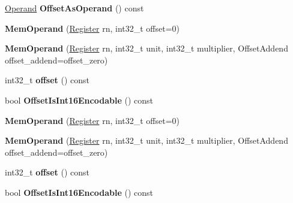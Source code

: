 \begin{DoxyCompactItemize}
\item 
\hyperlink{classv8_1_1internal_1_1_operand}{Operand} {\bfseries Offset\+As\+Operand} () const \hypertarget{classv8_1_1internal_1_1_mem_operand_aabe0e2c14d46c214bda605293d7804b3}{}\label{classv8_1_1internal_1_1_mem_operand_aabe0e2c14d46c214bda605293d7804b3}

\item 
{\bfseries Mem\+Operand} (\hyperlink{structv8_1_1internal_1_1_register}{Register} rn, int32\+\_\+t offset=0)\hypertarget{classv8_1_1internal_1_1_mem_operand_a7edbeda729ce9248b7151164c72e41ef}{}\label{classv8_1_1internal_1_1_mem_operand_a7edbeda729ce9248b7151164c72e41ef}

\item 
{\bfseries Mem\+Operand} (\hyperlink{structv8_1_1internal_1_1_register}{Register} rn, int32\+\_\+t unit, int32\+\_\+t multiplier, Offset\+Addend offset\+\_\+addend=offset\+\_\+zero)\hypertarget{classv8_1_1internal_1_1_mem_operand_a5cd48c156f36f5795f1982b2ccb52740}{}\label{classv8_1_1internal_1_1_mem_operand_a5cd48c156f36f5795f1982b2ccb52740}

\item 
int32\+\_\+t {\bfseries offset} () const \hypertarget{classv8_1_1internal_1_1_mem_operand_a6f903824080ee1303755a0132bb93d79}{}\label{classv8_1_1internal_1_1_mem_operand_a6f903824080ee1303755a0132bb93d79}

\item 
bool {\bfseries Offset\+Is\+Int16\+Encodable} () const \hypertarget{classv8_1_1internal_1_1_mem_operand_ab944c21969d5900518c8d222248e7d3b}{}\label{classv8_1_1internal_1_1_mem_operand_ab944c21969d5900518c8d222248e7d3b}

\item 
{\bfseries Mem\+Operand} (\hyperlink{structv8_1_1internal_1_1_register}{Register} rn, int32\+\_\+t offset=0)\hypertarget{classv8_1_1internal_1_1_mem_operand_a7edbeda729ce9248b7151164c72e41ef}{}\label{classv8_1_1internal_1_1_mem_operand_a7edbeda729ce9248b7151164c72e41ef}

\item 
{\bfseries Mem\+Operand} (\hyperlink{structv8_1_1internal_1_1_register}{Register} rn, int32\+\_\+t unit, int32\+\_\+t multiplier, Offset\+Addend offset\+\_\+addend=offset\+\_\+zero)\hypertarget{classv8_1_1internal_1_1_mem_operand_a5cd48c156f36f5795f1982b2ccb52740}{}\label{classv8_1_1internal_1_1_mem_operand_a5cd48c156f36f5795f1982b2ccb52740}

\item 
int32\+\_\+t {\bfseries offset} () const \hypertarget{classv8_1_1internal_1_1_mem_operand_a6f903824080ee1303755a0132bb93d79}{}\label{classv8_1_1internal_1_1_mem_operand_a6f903824080ee1303755a0132bb93d79}

\item 
bool {\bfseries Offset\+Is\+Int16\+Encodable} () const \hypertarget{classv8_1_1internal_1_1_mem_operand_ab944c21969d5900518c8d222248e7d3b}{}\label{classv8_1_1internal_1_1_mem_operand_ab944c21969d5900518c8d222248e7d3b}

\end{DoxyCompactItemize}
